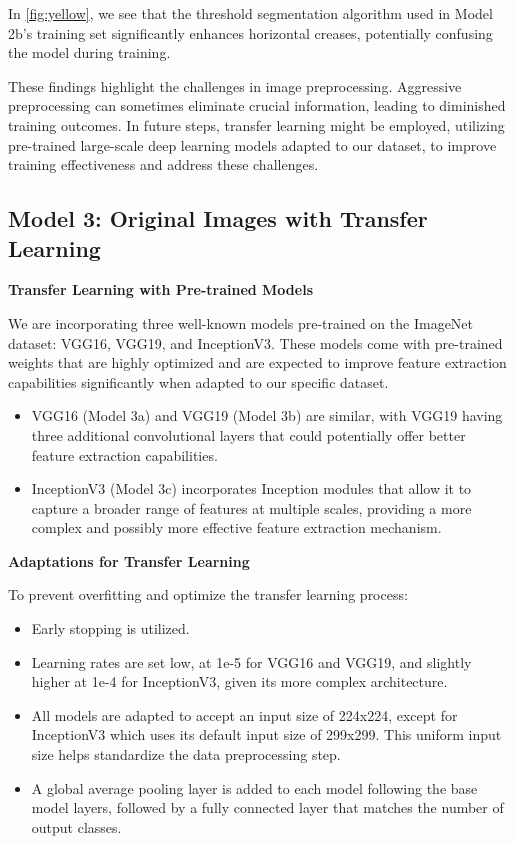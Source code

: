 In \autoref{fig:yellow}, we see that the threshold segmentation algorithm used in Model 2b’s training set significantly enhances horizontal creases, potentially confusing the model during training.

These findings highlight the challenges in image preprocessing. Aggressive preprocessing can sometimes eliminate crucial information, leading to diminished training outcomes. In future steps, transfer learning might be employed, utilizing pre-trained large-scale deep learning models adapted to our dataset, to improve training effectiveness and address these challenges.


\subsection{Model 3: Original Images with Transfer Learning}

\textbf{Transfer Learning with Pre-trained Models}

We are incorporating three well-known models pre-trained on the ImageNet dataset: VGG16, VGG19, and InceptionV3. These models come with pre-trained weights that are highly optimized and are expected to improve feature extraction capabilities significantly when adapted to our specific dataset.

\begin{itemize}
    \item VGG16 (Model 3a) and VGG19 (Model 3b) are similar, with VGG19 having three additional convolutional layers that could potentially offer better feature extraction capabilities.
    \item InceptionV3 (Model 3c) incorporates Inception modules that allow it to capture a broader range of features at multiple scales, providing a more complex and possibly more effective feature extraction mechanism.
\end{itemize}

\textbf{Adaptations for Transfer Learning}

To prevent overfitting and optimize the transfer learning process:

\begin{itemize}
    \item Early stopping is utilized.
    \item Learning rates are set low, at 1e-5 for VGG16 and VGG19, and slightly higher at 1e-4 for InceptionV3, given its more complex architecture.
    \item All models are adapted to accept an input size of 224x224, except for InceptionV3 which uses its default input size of 299x299. This uniform input size helps standardize the data preprocessing step.
    \item A global average pooling layer is added to each model following the base model layers, followed by a fully connected layer that matches the number of output classes.
\end{itemize}



